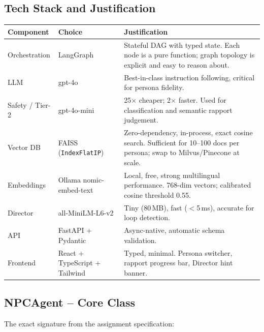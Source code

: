 \documentclass[11pt,a4paper]{article}
\begin{document}
\subsection{Tech Stack and Justification}

\begin{center}
\begin{tabularx}{0.96\linewidth}{@{}llX@{}}
\toprule
\textbf{Component} & \textbf{Choice} & \textbf{Justification} \\
\midrule
Orchestration & LangGraph &
  Stateful DAG with typed state. Each node is a pure function;
  graph topology is explicit and easy to reason about. \\
LLM & gpt-4o &
  Best-in-class instruction following, critical for persona fidelity. \\
Safety / Tier-2 & gpt-4o-mini &
  25$\times$ cheaper; 2$\times$ faster. Used for classification and
  semantic rapport judgement. \\
Vector DB & FAISS (\texttt{IndexFlatIP}) &
  Zero-dependency, in-process, exact cosine search. Sufficient for
  10--100 docs per persona; swap to Milvus/Pinecone at scale. \\
Embeddings & Ollama nomic-embed-text &
  Local, free, strong multilingual performance. 768-dim vectors;
  calibrated cosine threshold 0.55. \\
Director & all-MiniLM-L6-v2 &
  Tiny (80\,MB), fast ($<$5\,ms), accurate for loop detection. \\
API & FastAPI + Pydantic &
  Async-native, automatic schema validation. \\
Frontend & React + TypeScript + Tailwind &
  Typed, minimal. Persona switcher, rapport progress bar, Director
  hint banner. \\
\bottomrule
\end{tabularx}
\end{center}

\subsection{NPCAgent -- Core Class}

The exact signature from the assignment specification:
\end{document}
